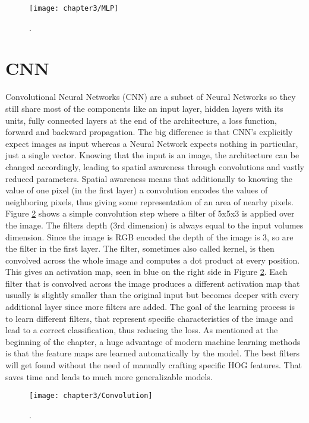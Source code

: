 \begin{figure}[H]
  \centering
  \caption{. \cite{cs231nconvolution}}
  \texttt{[image: chapter3/MLP]}
  \label{fig:MLP}
\end{figure}

\section{CNN}

Convolutional Neural Networks (CNN) are a subset of Neural Networks so they still share most of the components like an input layer, hidden layers with its units, fully connected layers at the end of the architecture, a loss function, forward and backward propagation. The big difference is that CNN's explicitly expect images as input whereas a Neural Network expects nothing in particular, just a single vector. Knowing that the input is an image, the architecture can be changed accordingly, leading to spatial awareness through convolutions and vastly reduced parameters. Spatial awareness means that additionally to knowing the value of one pixel (in the first layer) a convolution encodes the values of neighboring pixels, thus giving some representation of an area of nearby pixels. Figure \ref{fig:Convolution} shows a simple convolution step where a filter of 5x5x3 is applied over the image. The filters depth (3rd dimension) is always equal to the input volumes dimension. Since the image is RGB encoded the depth of the image is 3, so are the filter in the first layer. The filter, sometimes also called kernel, is then convolved across the whole image and computes a dot product at every position. This gives an activation map, seen in blue on the right side in Figure \ref{fig:Convolution}. Each filter that is convolved across the image produces a different activation map that usually is slightly smaller than the original input but becomes deeper with every additional layer since more filters are added. The goal of the learning process is to learn different filters, that represent specific characteristics of the image and lead to a correct classification, thus reducing the loss. As mentioned at the beginning of the chapter, a huge advantage of modern machine learning methods is that the feature maps are learned automatically by the model. The best filters will get found without the need of manually crafting specific HOG features. That saves time and leads to much more generalizable models.

\begin{figure}[H]
  \centering
  \caption{. \cite{cs231nconvolution}}
  \texttt{[image: chapter3/Convolution]}
  \label{fig:Convolution}
\end{figure}

